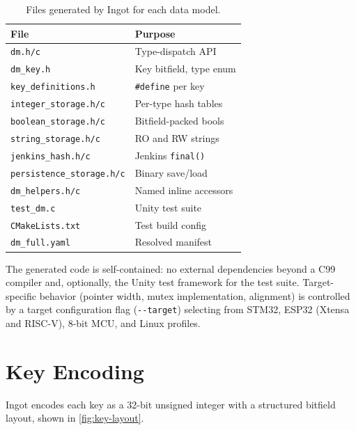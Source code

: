 \documentclass[10pt,twocolumn,letterpaper]{article}
\begin{document}
\begin{table}[t]
\centering
\footnotesize
\setlength{\tabcolsep}{3pt}
\begin{tabular}{@{}lp{4.0cm}@{}}
\toprule
\textbf{File} & \textbf{Purpose} \\
\midrule
\texttt{dm.h/c} & Type-dispatch API \\
\texttt{dm\_key.h} & Key bitfield, type enum \\
\texttt{key\_definitions.h} & \texttt{\#define} per key \\
\texttt{integer\_storage.h/c} & Per-type hash tables \\
\texttt{boolean\_storage.h/c} & Bitfield-packed bools \\
\texttt{string\_storage.h/c} & RO and RW strings \\
\texttt{jenkins\_hash.h/c} & Jenkins \texttt{final()} \\
\texttt{persistence\_storage.h/c} & Binary save/load \\
\texttt{dm\_helpers.h/c} & Named inline accessors \\
\texttt{test\_dm.c} & Unity test suite \\
\texttt{CMakeLists.txt} & Test build config \\
\texttt{dm\_full.yaml} & Resolved manifest \\
\bottomrule
\end{tabular}
\caption{Files generated by Ingot for each data model.}
\label{tab:generated-files}
\end{table}

The generated code is self-contained: no external dependencies beyond
a C99 compiler and, optionally, the Unity test framework for the test
suite.  Target-specific behavior (pointer width, mutex
implementation, alignment) is controlled by a target configuration
flag (\texttt{-{}-target}) selecting from STM32, ESP32 (Xtensa and
RISC-V), 8-bit MCU, and Linux profiles.

\section{Key Encoding}
\label{sec:key-encoding}

Ingot encodes each key as a 32-bit unsigned integer with a structured
bitfield layout, shown in \cref{fig:key-layout}.
\end{document}
